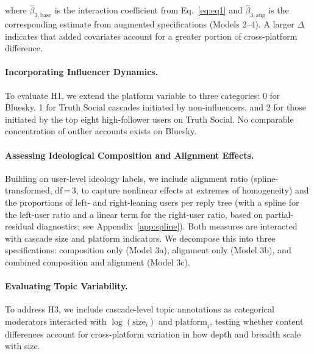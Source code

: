 \documentclass[letterpaper]{article} %
\begin{document}
where $\hat{\beta}_{3,\text{base}}$ is the interaction coefficient from Eq.~\ref{eq:eq1} and $\hat{\beta}_{3,\text{aug}}$ is the corresponding estimate from augmented specifications (Models 2--4). A larger $\Delta$ indicates that added covariates account for a greater portion of cross-platform difference.

\paragraph*{Incorporating Influencer Dynamics.}
To evaluate H1, we extend the platform variable to three categories: 0 for Bluesky, 1 for Truth Social cascades initiated by non-influencers, and 2 for those initiated by the top eight high-follower users on Truth Social. No comparable concentration of outlier accounts exists on Bluesky.

\paragraph*{Assessing Ideological Composition and Alignment Effects.}
Building on user-level ideology labels, we include alignment ratio (spline-transformed, df\,=\,3, to capture nonlinear effects at extremes of homogeneity) and the proportions of left- and right-leaning users per reply tree (with a spline for the left-user ratio and a linear term for the right-user ratio, based on partial-residual diagnostics; see Appendix~\ref{app:spline}). Both measures are interacted with cascade size and platform indicators. We decompose this into three specifications: composition only (Model 3a), alignment only (Model 3b), and combined composition and alignment (Model 3c). 

\paragraph*{Evaluating Topic Variability.}
To address H3, we include cascade-level topic annotations as categorical moderators interacted with $\log(\text{size}_i)$ and $\text{platform}_i$, testing whether content differences account for cross-platform variation in how depth and breadth scale with size.
\end{document}
